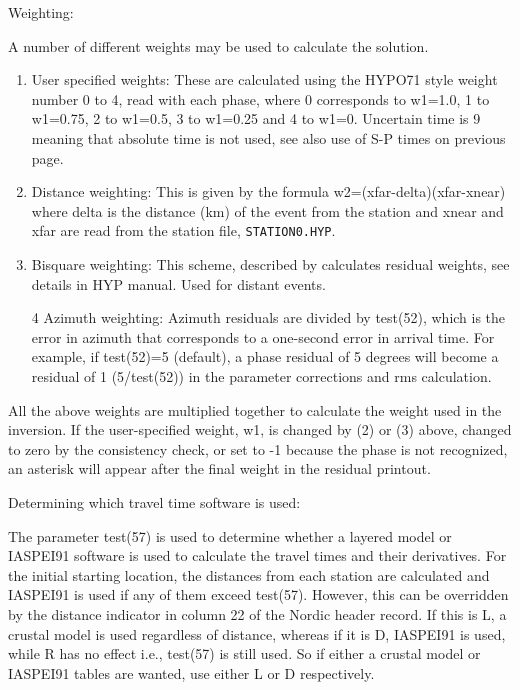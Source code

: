 Weighting: 

A number of different weights may be used to calculate the solution.

\begin{enumerate}
\item User specified weights: These are calculated using the HYPO71 style weight number 0 to 4, read with each phase, where 0 corresponds to w1=1.0, 1 to w1=0.75, 2 to w1=0.5, 3 to w1=0.25 and 4 to w1=0. Uncertain time is 9 meaning that absolute time is not used, see also use of S-P times on previous page. 
\item {}Distance weighting: This is given by the formula w2=(xfar-delta)(xfar-xnear) where delta is the distance (km) of the event from the station and xnear and xfar are read from the station file, \texttt{STATION0.HYP}. 
\item Bisquare weighting: This scheme, described by \citet{anderson1982} calculates residual weights, see details in HYP manual. Used for distant events. 
\item[4] Azimuth weighting: Azimuth residuals are divided by test(52), which is the error in azimuth that corresponds to a one-second error in arrival time. For example, if test(52)=5 (default), a phase residual of 5 degrees will become a residual of 1 (5/test(52)) in the parameter corrections and rms calculation. 
\end{enumerate}

All the above weights are multiplied together to calculate the weight 
used in the inversion. If the user-specified weight, w1, is changed by (2) or (3) above, changed to zero by the consistency check, or set to -1 because the phase is not recognized, an asterisk will appear after the final weight in the residual printout. 

Determining which travel time software is used: 

The parameter test(57) is used to determine whether a layered model or IASPEI91 software is used to calculate the travel times and their derivatives. For the initial starting location, the distances from each station are calculated and IASPEI91 is used if any of them exceed test(57). However, this can be overridden by the distance indicator in column 22 of the Nordic header record. If this is L, a crustal model is used regardless of distance, whereas if it is D, IASPEI91 is used, while R has no effect i.e., test(57) is still used. So if either a crustal model or IASPEI91 tables are wanted, use either L or D respectively. 

